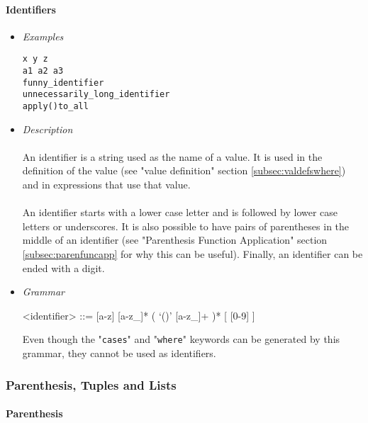 \documentclass{article}
\begin{document}
\paragraph{Identifiers}
\begin{itemize}

\item \textit{Examples}
\begin{verbatim}
x y z
a1 a2 a3 
funny_identifier 
unnecessarily_long_identifier
apply()to_all
\end{verbatim}

\item \textit{Description} \\\\
An identifier is a string used as the name of a value. It is used in the
definition of the value (see "value definition" section
\ref{subsec:valdefswhere}) and in expressions that use that value.
\\\\
An identifier starts with a lower case letter and is followed by lower case
letters or underscores. It is also possible to have pairs of parentheses in the
middle of an identifier (see "Parenthesis Function Application" section
\ref{subsec:parenfuncapp} for why this can be useful).  Finally, an identifier
can be ended with a digit.

\item \textit{Grammar}
\begin{grammar}
<identifier> ::= [a-z] [a-z_]* ( `()' [a-z_]+ )* [ [0-9] ]
\end{grammar}
Even though the "\texttt{cases}" and "\texttt{where}" keywords can be generated
by this grammar, they cannot be used as identifiers.

\end{itemize}

\newpage
\subsubsection{Parenthesis, Tuples and Lists}

\paragraph{Parenthesis}
\end{document}
